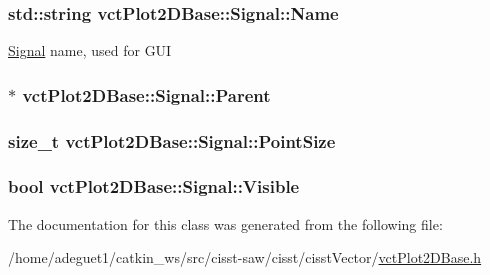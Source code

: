 \hypertarget{classvct_plot2_d_base_1_1_signal_afbc80a39a5230239d4b8d55ea36586ea}{
\subsubsection[{Name}]{\setlength{\rightskip}{0pt plus 5cm}std\-::string vct\-Plot2\-D\-Base\-::\-Signal\-::\-Name\hspace{0.3cm}{\ttfamily [protected]}}}\label{classvct_plot2_d_base_1_1_signal_afbc80a39a5230239d4b8d55ea36586ea}
\hyperlink{classvct_plot2_d_base_1_1_signal}{Signal} name, used for G\-U\-I \hypertarget{classvct_plot2_d_base_1_1_signal_ac96c27d6b67933a136845f700bc4e22c}{
\subsubsection[{Parent}]{$\ast$ vct\-Plot2\-D\-Base\-::\-Signal\-::\-Parent\hspace{0.3cm}{\ttfamily [protected]}}}\label{classvct_plot2_d_base_1_1_signal_ac96c27d6b67933a136845f700bc4e22c}
\hypertarget{classvct_plot2_d_base_1_1_signal_a3c18f2c69447f7e310510f9749f9000f}{
\subsubsection[{Point\-Size}]{\setlength{\rightskip}{0pt plus 5cm}size\-\_\-t vct\-Plot2\-D\-Base\-::\-Signal\-::\-Point\-Size\hspace{0.3cm}{\ttfamily [protected]}}}\label{classvct_plot2_d_base_1_1_signal_a3c18f2c69447f7e310510f9749f9000f}
\hypertarget{classvct_plot2_d_base_1_1_signal_a7b4f18f8aef3c6353c64d86274c397bd}{
\subsubsection[{Visible}]{\setlength{\rightskip}{0pt plus 5cm}bool vct\-Plot2\-D\-Base\-::\-Signal\-::\-Visible\hspace{0.3cm}{\ttfamily [protected]}}}\label{classvct_plot2_d_base_1_1_signal_a7b4f18f8aef3c6353c64d86274c397bd}


The documentation for this class was generated from the following file\-:\begin{DoxyCompactItemize}
\item 
/home/adeguet1/catkin\-\_\-ws/src/cisst-\/saw/cisst/cisst\-Vector/\hyperlink{vct_plot2_d_base_8h}{vct\-Plot2\-D\-Base.\-h}\end{DoxyCompactItemize}
